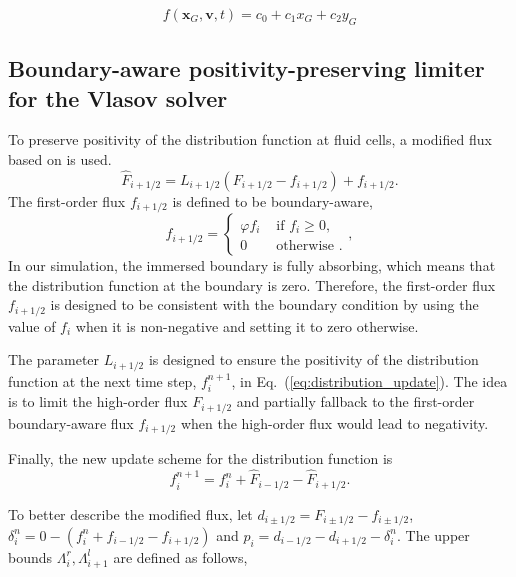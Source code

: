 \begin{equation}
	f(\mathbf{x}_G, \mathbf{v}, t) = c_0 + c_1x_G + c_2y_G
	\label{eq:extrapolation}
\end{equation}

\subsection{Boundary-aware positivity-preserving limiter for the Vlasov solver}
To preserve positivity of the distribution function at fluid cells, a modified flux based on \cite{xiong2014high} is used.
\begin{equation}
	\hat{F}_{i+1/2} = L_{i+1/2} \left( F_{i+1/2} - f_{i+1/2} \right) + f_{i+1/2}.
	\label{eq:modified_flux}
\end{equation}
The first-order flux $f_{i+1/2}$ is defined to be boundary-aware,
\begin{equation}
	f_{i+1/2} = \begin{cases}
		\varphi f_i & \text{ if $f_i \geq 0$}, \\
		0           & \text{ otherwise }.
	\end{cases},
	\label{eq:boundary_aware_flux}
\end{equation}
In our simulation, the immersed boundary is fully absorbing, which means that the distribution function at the boundary is zero. Therefore, the first-order flux $f_{i+1/2}$ is designed to be consistent with the boundary condition by using the value of $f_i$ when it is non-negative and setting it to zero otherwise.

The parameter $L_{i+1/2}$ is designed to ensure the positivity of the distribution function at the next time step, $f_i^{n+1}$, in Eq.~(\ref{eq:distribution_update}). The idea is to limit the high-order flux $F_{i+1/2}$ and partially fallback to the first-order boundary-aware flux $f_{i+1/2}$ when the high-order flux would lead to negativity.

Finally, the new update scheme for the distribution function is
\begin{equation}
	f_i^{n+1} = f_i^n + \hat{F}_{i -1/2} - \hat{F}_{i+1/2}.
	\label{eq:final_update}
\end{equation}

To better describe the modified flux, let $d_{i\pm1/2} = F_{i\pm1/2} - f_{i\pm1/2}$, $\delta_i^n = 0 - (f_i^n + f_{i-1/2} - f_{i+1/2})$ and $p_i = d_{i-1/2} - d_{i+1/2} - \delta_i^n$. The upper bounds $\Lambda_i^r, \Lambda_{i+1}^l$ are defined as follows,

